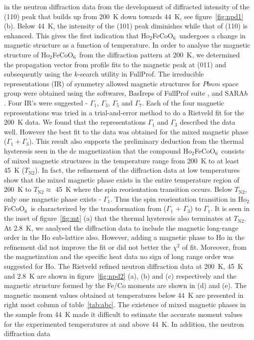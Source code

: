 \documentclass[12pt,twocolumns]{iopart}
\newcommand{\HFCO}{Ho$_2$FeCoO$_6$}
\begin{document}
in the neutron diffraction data from the development of
diffracted intensity of the (110) peak that builds up from
200~K down towards 44~K, see figure~\ref{fig:npd1} (b).
Below 44~K, the intensity of the (101) peak diminishes while
that of (110) is enhanced.
This gives the first indication that \HFCO\ undergoes a change
in magnetic structure as a function of temperature.
In order to analyse the magnetic structure of \HFCO\ from the diffraction
pattern at 200~K, we determined the propagation vector
from profile fits to the magnetic peak
at (011) and subsequently using the $k$-search utility in FullProf.
The irreducible representations (IR) of symmetry allowed magnetic structures
for $Pbnm$ space group were obtained using the softwares, BasIreps of FullProf suite \cite{rodriguez2011basireps},\cite{ritter2011neutrons}  and SARA$h$ \cite{sarah}.
Four IR's were suggested - $\Gamma_1$, $\Gamma_3$, $\Gamma_5$
and $\Gamma_7$.
%
Each of the four magnetic representations was tried in a
trial-and-error method to do a Rietveld fit for the 200~K data.
We found that the representations $\Gamma_1$ and $\Gamma_3$
described the data well. However the best fit to the data
was obtained for the mixed magnetic phase ($\Gamma_1 + \Gamma_3$).
This result also supports the preliminary deduction from the
thermal hysteresis seen in the dc magnetization that the compound
\HFCO\ consists of mixed magnetic structures in the temperature range
from 200~K to at least 45~K ($T_\mathrm{N2}$).
%
In fact, the refinement of the diffraction data at low
temperatures show that the mixed magnetic phase exists in the
entire temperature region of 200~K to $T_\mathrm{N2} \approx$ 45~K
where the spin reorientation transition occurs.
Below $T_\mathrm{N2}$, only one magnetic phase exists - $\Gamma_1$.
Thus the spin reorientation transition in \HFCO\ is characterized
by the transformation from ($\Gamma_1$ + $\Gamma_3$) to $\Gamma_1$.
It is seen in the inset of figure~\ref{fig:mt} (a)
that the thermal hysteresis also terminates at $T_\mathrm{N2}$.
 At 2.8~K, we analysed the diffraction data to include
the magnetic long-range order in the Ho sub-lattice also. However,
adding a magnetic phase to Ho in the refinement did not improve the
fit or did not better the $\chi^2$ of fit. Moreover, from the
magnetization and the specific heat data no sign of long range
order was suggested for Ho.
%
The Rietveld refined neutron diffraction data at
200~K, 45~K and 2.8~K are shown in figure~\ref{fig:npd2} (a), (b)
and (c) respectively and the magnetic structure formed by the Fe/Co moments
are shown in (d) and (e). The magnetic moment values obtained at temperatures below 44~K are presented in right most column of table~\ref{tab:abc}. The existence of mixed magnetic phases in the sample from 44~K made it difficult to estimate the accurate moment values for the experimented temperatures at and above 44~K. In addition, the neutron diffraction data
\end{document}
